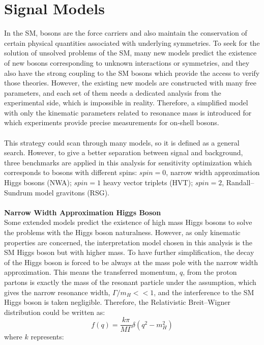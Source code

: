 \section{Signal Models}
\label{sec:signal_intro}
In the SM, bosons are the force carriers and also maintain the conservation of certain physical quantities associated with underlying symmetries. To seek for the solution of unsolved problems of the SM, many new models predict the existence of new bosons corresponding to unknown interactions or symmetries, and they also have the strong coupling to the SM bosons which provide the access to verify those theories. However, the existing new models are constructed with many free parameters, and each set of them needs a dedicated analysis from the experimental side, which is impossible in reality. Therefore, a simplified model with only the kinematic parameters related to resonance mass is introduced for which experiments provide precise measurements for on-shell bosons.  
\\
\\This strategy could scan through many models, so it is defined as a general search. However, to give a better separation between signal and background, three benchmarks are applied in this analysis for sensitivity optimization which corresponds to bosons with different spins: $spin=0$, narrow width approximation Higgs bosons (NWA); $spin=1$ heavy vector triplets (HVT); $spin=2$, Randall–Sundrum model gravitons (RSG).
\\
\\{\bf Narrow Width Approximation Higgs Boson}
\\
Some extended models predict the existence of high mass Higgs bosons to solve the problems with the Higgs boson naturalness. However, as only kinematic properties are concerned, the interpretation model chosen in this analysis is the SM Higgs boson but with higher mass. To have further simplification, the decay of the Higgs boson is forced to be always at the mass pole with the narrow width approximation. This means the transferred momentum, $q$, from the proton partons is exactly the mass of the resonant particle under the assumption, which gives the narrow resonance width, $\Gamma/m_{H}<<1$, and the interference to the SM Higgs boson is taken negligible\cite{NWAInterference}. Therefore, the Relativistic Breit–Wigner distribution could be written as:
\begin{equation}
f(q) = \frac{k\pi}{M\Gamma}\delta(q^2-m_{H}^2)
\end{equation}
where $k$ represents:
